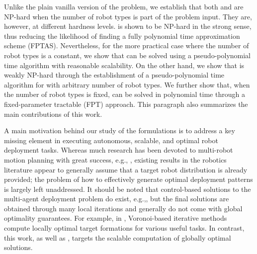 Unlike the plain vanilla version of the \opg problem, we establish that both 
\opglr and \opgmc are NP-hard when the number of robot types is part of the 
problem input. They are, however, at different hardness levels. \opglr is shown 
to be NP-hard in the strong sense, thus reducing the likelihood of finding a fully
polynomial time approximation scheme (FPTAS).
Nevertheless, for the more practical case where the number of robot types 
is a constant, we show that \opglr can be solved using a pseudo-polynomial 
time algorithm with reasonable scalability. On the other hand, we show that 
\opgmc is weakly NP-hard through the establishment of a pseudo-polynomial 
time algorithm for \opgmc with arbitrary number of robot types. 
We further show that, when the number of robot types is fixed, \opgmc can be 
solved in polynomial time through a fixed-parameter tractable (FPT) approach.
This paragraph also summarizes the main contributions of this work. 

A main motivation behind our study of the \opg formulations is to address 
a key missing element in executing autonomous, scalable, and optimal robot 
deployment tasks. Whereas much research has been devoted to multi-robot 
motion planning \cite{ErdLoz86,arai2002advances} with great success, e.g., 
\cite{blm-rvo,smith2009monotonic,ayanian2010decentralized,turpin2014capt,
alonso2015multi,SolYu15}, existing results in the robotics literature appear 
to generally assume that a target robot distribution is already provided; the 
problem of how to effectively generate optimal deployment patterns is largely 
left unaddressed. It should be noted that control-based solutions to the 
multi-agent deployment problem do exist, e.g.,\cite{ando1999distributed,
jadbabaie2003coordination,cortes2004coverage,ren2005consensus,
schwager2009optimal,yu2012rendezvous,morgan2016swarm}, but the final solutions 
are obtained through many local iterations and generally do not come with 
global optimality guarantees. For example, in \cite{cortes2004coverage}, 
Voronoi-based iterative methods compute locally optimal target formations 
for various useful tasks. In contrast, this work, as well as 
\cite{FenHanGaoYu19RSS}, targets the scalable computation of globally optimal 
solutions. 

